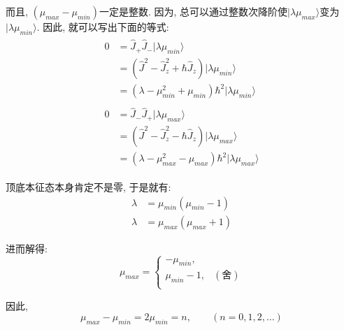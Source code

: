 \documentclass[a4paper, 11pt]{article}
\begin{document}
\begin{spacing}{1.2}
      而且, $\left(\mu_{max}-\mu_{min}\right)$一定是整数. 因为, 总可以通过整数次降阶使$|\lambda\mu_{max}\rangle$变为
      $|\lambda\mu_{min}\rangle$. 因此, 就可以写出下面的等式:
      \begin{subequations}
        \begin{align}
          \begin{aligned}
           0 &= \hat{J}_+\hat{J}_-|\lambda\mu_{min}\rangle\\
             &= \left(\hat{J}^2 - \hat{J}_z^2+\hbar\hat{J}_z\right)|\lambda\mu_{min}\rangle\\
             &= \left(\lambda - \mu_{min}^2+\mu_{min}\right)\hbar^2|\lambda\mu_{min}\rangle
          \end{aligned}\\
          \begin{aligned}
            0 &= \hat{J}_-\hat{J}_+|\lambda\mu_{max}\rangle\\
              &= \left(\hat{J}^2 - \hat{J}_z^2-\hbar\hat{J}_z\right)|\lambda\mu_{max}\rangle\\
              &= \left(\lambda - \mu_{max}^2-\mu_{max}\right)\hbar^2|\lambda\mu_{max}\rangle
          \end{aligned}
        \end{align}
      \end{subequations}

      顶底本征态本身肯定不是零, 于是就有:
      \begin{equation}
        \begin{aligned}
          \lambda &= \mu_{min}\left(\mu_{min}-1\right)\\
          \lambda &= \mu_{max}\left(\mu_{max}+1\right)
        \end{aligned}
      \end{equation}

      进而解得:
      \begin{equation}
        \mu_{max} = \left\{\begin{array}{ll}
          -\mu_{min}, & \\
          \mu_{min}-1, &(\text{舍})\\
        \end{array}\right.
      \end{equation}

      因此, 
      \begin{equation}
        \mu_{max}-\mu_{min} = 2\mu_{min} = n, \qquad (n=0,1,2,\ldots)
      \end{equation}


\end{spacing}
\end{document}
